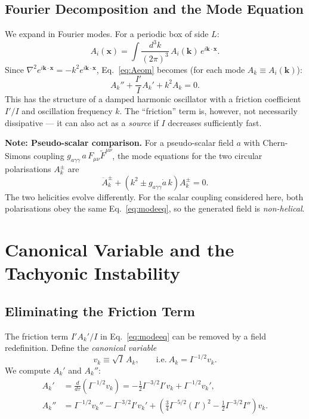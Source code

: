 \documentclass[12pt,a4paper,openany]{book}
\newcommand{\Fmn}{F_{\mu\nu}}
\newcommand{\Ak}{A_k}
\newcommand{\vk}{v_k}
\begin{document}
\section{Fourier Decomposition and the Mode Equation}

We expand in Fourier modes. For a periodic box of side $L$:
\begin{equation}
  A_i(\mathbf{x}) = \int\frac{d^3k}{(2\pi)^3}\,A_i(\mathbf{k})\,e^{i\mathbf{k}\cdot\mathbf{x}}.
\end{equation}
Since $\nabla^2 e^{i\mathbf{k}\cdot\mathbf{x}} = -k^2 e^{i\mathbf{k}\cdot\mathbf{x}}$, Eq.~\eqref{eq:Aeom} becomes (for each mode $A_k \equiv A_i(\mathbf{k})$):
\begin{equation}
  \boxed{A_k'' + \frac{I'}{I}A_k' + k^2 A_k = 0.}
  \label{eq:modeeq}
\end{equation}
This has the structure of a damped harmonic oscillator with a friction coefficient $I'/I$ and oscillation frequency $k$. The ``friction'' term is, however, not necessarily dissipative — it can also act as a \emph{source} if $I$ decreases sufficiently fast.

\medskip
\noindent\textbf{Note: Pseudo-scalar comparison.} For a pseudo-scalar field $a$ with Chern-Simons coupling $g_{a\gamma\gamma}\,a\,\Fmn\tilde{F}^{\mu\nu}$, the mode equations for the two circular polarisations $A_k^\pm$ are
\begin{equation}
  \ddot{A}_k^\pm + \left(k^2 \pm g_{a\gamma\gamma}\dot{a}\,k\right)A_k^\pm = 0.
\end{equation}
The two helicities evolve differently. For the scalar coupling considered here, both polarisations obey the same Eq.~\eqref{eq:modeeq}, so the generated field is \emph{non-helical}.

\chapter{Canonical Variable and the Tachyonic Instability}

\section{Eliminating the Friction Term}

The friction term $I'A_k'/I$ in Eq.~\eqref{eq:modeeq} can be removed by a field redefinition. Define the \emph{canonical variable}
\begin{equation}
  \vk \equiv \sqrt{I}\,\Ak, \qquad \text{i.e.}\ \Ak = I^{-1/2}\vk.
\end{equation}
We compute $\Ak'$ and $\Ak''$:
\begin{align}
  \Ak' &= \frac{d}{d\tau}(I^{-1/2}\vk) = -\frac{1}{2}I^{-3/2}I'\vk + I^{-1/2}\vk', \\
  \Ak'' &= I^{-1/2}\vk'' - I^{-3/2}I'\vk' + \left(\frac{3}{4}I^{-5/2}(I')^2 - \frac{1}{2}I^{-3/2}I''\right)\vk.
\end{align}
\end{document}
